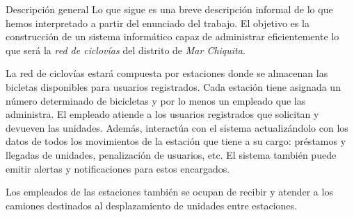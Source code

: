  
%
%
\begin{subsection}{Descripción general}
Lo que sigue es una breve descripción informal de lo que hemos interpretado a partir del enunciado del trabajo. El objetivo es la construcción de un sistema informático capaz de administrar eficientemente lo que será la \emph{red de ciclovías} del distrito de \emph{Mar Chiquita}.

La red de ciclovías estará compuesta por estaciones donde se almacenan las bicletas disponibles para usuarios registrados. Cada estación tiene asignada un número determinado de bicicletas y por lo menos un empleado que las administra. El empleado atiende a los usuarios registrados que solicitan y devueven las unidades. Además, interactúa con el sistema actualizándolo con los datos de todos los movimientos de la estación que tiene a su cargo: préstamos y llegadas de unidades, penalización de usuarios, etc. El sistema también puede emitir alertas y notificaciones para estos encargados.

Los empleados de las estaciones también se ocupan de recibir y atender a los camiones destinados al desplazamiento de unidades entre estaciones.
\end{subsection}

